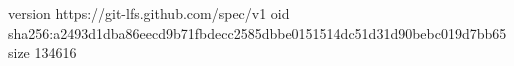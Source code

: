 version https://git-lfs.github.com/spec/v1
oid sha256:a2493d1dba86eecd9b71fbdecc2585dbbe0151514dc51d31d90bebc019d7bb65
size 134616
